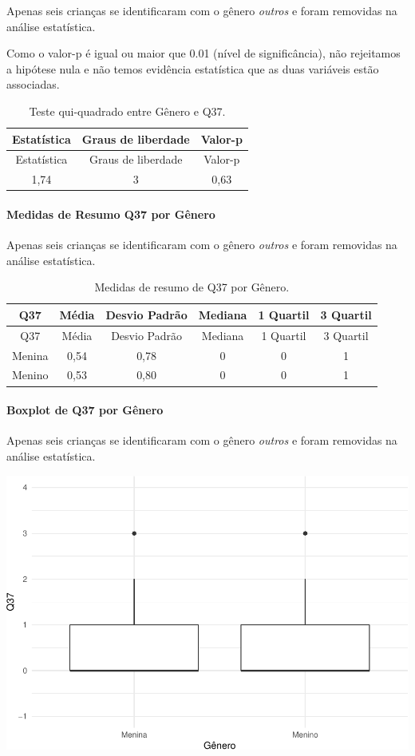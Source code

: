 \documentclass[]{article}
\let\oldparagraph\paragraph
\renewcommand{\paragraph}[1]{\oldparagraph{#1}\mbox{}}
\begin{document}
Apenas seis crianças se identificaram com o gênero \emph{outros} e foram removidas na análise estatística.

Como o valor-p é igual ou maior que 0.01 (nível de significância), não rejeitamos a hipótese nula e não temos evidência estatística que as duas variáveis estão associadas.

\begin{longtable}[]{@{}ccc@{}}
\caption{\label{tab:unnamed-chunk-1383}Teste qui-quadrado entre Gênero e Q37.}\tabularnewline
\toprule
Estatística & Graus de liberdade & Valor-p\tabularnewline
\midrule
\endfirsthead
\toprule
Estatística & Graus de liberdade & Valor-p\tabularnewline
\midrule
\endhead
1,74 & 3 & 0,63\tabularnewline
\bottomrule
\end{longtable}

\cleardoublepage

\hypertarget{medidas-de-resumo-q37-por-guxeanero}{%
\paragraph{Medidas de Resumo Q37 por Gênero}\label{medidas-de-resumo-q37-por-guxeanero}}

Apenas seis crianças se identificaram com o gênero \emph{outros} e foram removidas na análise estatística.

\begin{longtable}[]{@{}cccccc@{}}
\caption{\label{tab:unnamed-chunk-1384}Medidas de resumo de Q37 por Gênero.}\tabularnewline
\toprule
Q37 & Média & Desvio Padrão & Mediana & 1 Quartil & 3 Quartil\tabularnewline
\midrule
\endfirsthead
\toprule
Q37 & Média & Desvio Padrão & Mediana & 1 Quartil & 3 Quartil\tabularnewline
\midrule
\endhead
Menina & 0,54 & 0,78 & 0 & 0 & 1\tabularnewline
Menino & 0,53 & 0,80 & 0 & 0 & 1\tabularnewline
\bottomrule
\end{longtable}

\hypertarget{boxplot-de-q37-por-guxeanero}{%
\paragraph{Boxplot de Q37 por Gênero}\label{boxplot-de-q37-por-guxeanero}}

Apenas seis crianças se identificaram com o gênero \emph{outros} e foram removidas na análise estatística.

\begin{center}\includegraphics[width=0.75\linewidth]{relatorio_covid19_files/figure-latex/unnamed-chunk-1385-1} \end{center}
\end{document}
